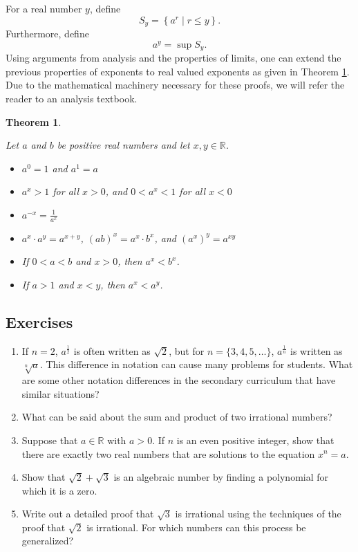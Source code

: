 \documentclass[
]{book}
\newtheorem{theorem}{Theorem}[chapter]
\theoremstyle{definition}
\theoremstyle{definition}
\theoremstyle{definition}
\theoremstyle{definition}
\theoremstyle{remark}
\begin{document}
For a real number \(y\), define \[S_y= \left\{ a^r \middle \vert r \leq y\right\}.\] Furthermore, define \[a^y = \sup S_y.\] Using arguments from analysis and the properties of limits, one can extend the previous properties of exponents to real valued exponents as given in Theorem \ref{thm:exponents-reals}. Due to the mathematical machinery necessary for these proofs, we will refer the reader to an analysis textbook.

\begin{theorem}
\protect\hypertarget{thm:exponents-reals}{}\label{thm:exponents-reals}

Let \(a\) and \(b\) be positive real numbers and let \(x,y\in \mathbb{R}\).

\begin{itemize}
\item
  \(a^0=1\) and \(a^1=a\)
\item
  \(a^x >1\) for all \(x>0\), and \(0<a^x<1\) for all \(x<0\)
\item
  \(a^{-x} = \frac{1}{a^x}\)
\item
  \(a^x\cdot a^y = a^{x+y}\), \((ab)^x=a^x\cdot b^x\), and \((a^x)^y = a^{xy}\)
\item
  If \(0<a<b\) and \(x>0\), then \(a^x<b^x\).
\item
  If \(a>1\) and \(x<y\), then \(a^x<a^y\).
\end{itemize}

\end{theorem}

\hypertarget{exercises-15}{%
\subsection{Exercises}\label{exercises-15}}

\begin{enumerate}
\def\labelenumi{\arabic{enumi}.}
\item
  If \(n=2\), \(a^\frac{1}{2}\) is often written as \(\sqrt{2}\), but for \(n=\{3,4,5, \ldots\}\), \(a^{\frac{1}{n}}\) is written as \(\sqrt[n]{a}\). This difference in notation can cause many problems for students. What are some other notation differences in the secondary curriculum that have similar situations?
\item
  What can be said about the sum and product of two irrational numbers?
\item
  Suppose that \(a\in \mathbb{R}\) with \(a>0\). If \(n\) is an even positive integer, show that there are exactly two real numbers that are solutions to the equation \(x^n=a\).
\item
  Show that \(\sqrt{2}+\sqrt{3}\) is an algebraic number by finding a polynomial for which it is a zero.
\item
  Write out a detailed proof that \(\sqrt{3}\) is irrational using the techniques of the proof that \(\sqrt{2}\) is irrational. For which numbers can this process be generalized?
\end{enumerate}
\end{document}
